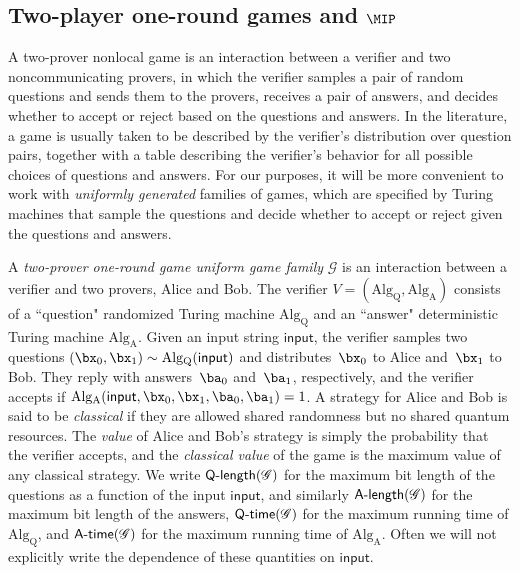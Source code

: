 \documentclass[11pt]{article}
\newcommand{\game}{\mathscr{G}}
\newcommand{\qtime}[1]{\mathsf{Q}\textnormal{-}\mathsf{time}(#1)}
\newcommand{\atime}[1]{\mathsf{A}\textnormal{-}\mathsf{time}(#1)}
\newcommand{\qlength}[1]{\mathsf{Q}\textnormal{-}\mathsf{length}(#1)}
\newcommand{\alength}[1]{\mathsf{A}\textnormal{-}\mathsf{length}(#1)}
\begin{document}
\subsection{Two-player one-round games and $\MIP$}
A two-prover nonlocal game is an interaction between a verifier and
two noncommunicating provers, in which the verifier samples a pair of random
questions and sends them to the provers, receives a pair of answers,
and decides whether to accept or reject based on the questions and answers. In the literature, a game is usually
taken to be described by the verifier's distribution over question
pairs, together with a table describing the verifier's behavior
for all possible choices of questions and answers. For our purposes,
it will be more convenient to work with \emph{uniformly generated} families of
games, which are specified by Turing machines that sample the
questions and decide whether to accept or reject given the questions
and answers.
\begin{definition}\label{def:two-player-one-round}
A \emph{two-prover one-round game uniform game family} $\game$
is an interaction between a verifier and two provers, Alice and Bob.
The verifier $V = (\mathrm{Alg_{\mathrm{Q}}}, \mathrm{Alg_{\mathrm{A}}})$
consists of a ``question" randomized Turing machine $\mathrm{Alg_{\mathrm{Q}}}$
and an ``answer" deterministic Turing machine $\mathrm{Alg_{\mathrm{A}}}$.
Given an input string $\mathsf{input}$, the verifier samples two questions
$(\bx_0, \bx_1) \sim \mathrm{Alg_{\mathrm{Q}}}(\mathsf{input})$ and distributes~$\bx_0$ to Alice and~$\bx_1$ to Bob.
They reply with answers~$\ba_0$ and~$\ba_1$, respectively, and the verifier accepts if
$\mathrm{Alg_{\mathrm{A}}}(\mathsf{input}, \bx_0, \bx_1, \ba_0, \ba_1) = 1$.
A strategy for Alice and Bob is said to be \emph{classical} if they are allowed shared randomness but no shared quantum resources.
The \emph{value} of Alice and Bob's strategy is simply the probability that the verifier accepts,
and the \emph{classical value} of the game is the maximum value of any classical strategy.
We write $\qlength{\game}$ for the maximum bit length
of the questions as a function of the input $\mathsf{input}$, and similarly
$\alength{\game}$ for the maximum bit length of the answers,
$\qtime{\game}$ for the maximum running time of $\mathrm{Alg}_{\mathrm{Q}}$,
and $\atime{\game}$ for the maximum running time of
$\mathrm{Alg}_{\mathrm{A}}$. Often we will not explicitly write the
dependence of these quantities on $\mathsf{input}$.
\end{definition}
\end{document}
